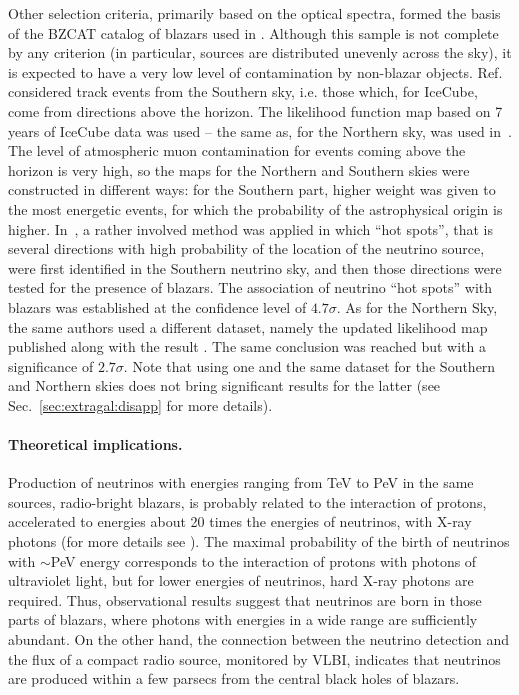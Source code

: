 \documentclass[a4paper,noshowpacs,noshowkeys,floatfix,twocolumn,preprintnumbers,nofootinbib]{revtex4-2}
\begin{document}
Other selection criteria, primarily based on the optical spectra, formed the basis of the BZCAT catalog of blazars used in \cite{Buson1, Buson2}. Although this sample is not complete by any criterion (in particular, sources are distributed unevenly across the sky), it is expected to have a very low level of contamination by non-blazar objects. Ref.~\cite{Buson1} considered track events from the Southern sky, i.e. those which, for IceCube, come from directions above the horizon. The likelihood function map based on 7 years of IceCube data was used -- the same as, for the Northern sky, was used in~\cite{neutradio2}. The level of atmospheric muon contamination for events coming above the horizon is very high, so the maps for the Northern and Southern skies were constructed in different ways: for the Southern part, higher weight was given to the most energetic events, for which the probability of the astrophysical origin is higher. In~\cite{Buson1}, a rather involved method was applied in which ``hot spots'', that is several directions with high probability of the location of the neutrino source, were first identified in the Southern neutrino sky, and then those directions were tested for the presence of blazars. The association of neutrino ``hot spots'' with blazars was established at the confidence level of $4.7\sigma$. As for the Northern Sky, the same authors used \cite{Buson2} a different dataset, namely the updated likelihood map published along with the result \cite{IceCube-NGC1068}. The same conclusion was reached but with a significance of $2.7\sigma$. Note that using one and the same dataset for the Southern and Northern skies does not bring significant results for the latter \cite{Disappearing-corr}
(see Sec.~\ref{sec:extragal:disapp} for more details).

\paragraph{Theoretical implications.}
Production of neutrinos with energies ranging from TeV to PeV in the same sources, radio-bright blazars, is probably related to the interaction of protons, accelerated to energies about 20 times the energies of neutrinos, with X-ray photons (for more details see \cite{ST-UFN}). The maximal probability of the birth of neutrinos with $\sim$PeV energy corresponds to the interaction of protons with photons of ultraviolet light, but for lower energies of neutrinos, hard X-ray photons are required. Thus, observational results suggest that neutrinos are born in those parts of blazars, where photons with energies in a wide range are sufficiently abundant. On the other hand, the connection between the neutrino detection and the flux of a compact radio source, monitored by VLBI, indicates that neutrinos are produced within a few parsecs from the central black holes of blazars.
\end{document}
